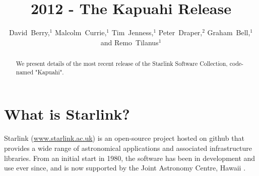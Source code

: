 
\resetcounters




\title{ 2012 - The Kapuahi Release}

\author{David~Berry,$^1$ Malcolm~Currie,$^1$ Tim~Jenness,$^1$ Peter~Draper,$^2$ Graham~Bell,$^1$ and Remo~Tilanus$^1$
}


\begin{abstract}
We present details of the most recent release of the Starlink Software
Collection, code-named "Kapuahi".
\end{abstract}

\section{What is Starlink?}

Starlink (\url{www.starlink.ac.uk}) is an open-source project hosted on github that provides a wide range of astronomical applications and associated infrastructure libraries. From an initial start in 1980, the software has been in development and use ever since, and is now supported by the Joint Astronomy Centre, Hawaii \citep{SSC_2009}.

